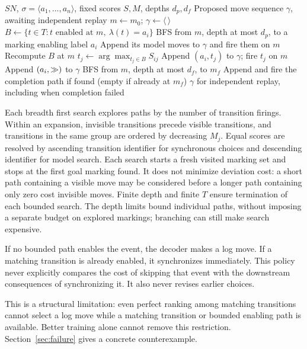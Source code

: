 \begin{algorithm}[!b]
\caption{Construct a candidate with bounded model move searches.}
\label{alg:decode}
\begin{algorithmic}[1]
\Require $SN$, $\sigma=\langle a_1,\ldots,a_n\rangle$, fixed scores $S,M$, depths $d_p,d_f$
\Ensure Proposed move sequence $\gamma$, awaiting independent replay
\State $m\gets m_0$; $\gamma\gets\langle\,\rangle$
  \State $B\gets\{t\in T:t\text{ enabled at }m,\ \lambda(t)=a_i\}$
    \State BFS from $m$, depth at most $d_p$, to a marking enabling label $a_i$
      \State Append its model moves to $\gamma$ and fire them on $m$
      \State Recompute $B$ at $m$
    \EndIf
  \EndIf
    \State $t_j\gets\arg\max_{t_j\in B}S_{ij}$ 
    \State Append $(a_i,t_j)$ to $\gamma$; fire $t_j$ on $m$
  \Else
    \State Append $(a_i,\gg)$ to $\gamma$ 
  \EndIf
\EndFor
\State BFS from $m$, depth at most $d_f$, to $m_f$
\State Append and fire the completion path if found (empty if already at $m_f$)
\State \Return $\gamma$ for independent replay, including when completion failed
\end{algorithmic}
\end{algorithm}

Each breadth first search explores paths by the number of transition firings. Within an expansion, invisible transitions precede visible transitions, and transitions in the same group are ordered by decreasing $M_j$. Equal scores are resolved by ascending transition identifier for synchronous choices and descending identifier for model search. Each search starts a fresh visited marking set and stops at the first goal marking found. It does not minimize deviation cost: a short path containing a visible move may be considered before a longer path containing only zero cost invisible moves. Finite depth and finite $T$ ensure termination of each bounded search. The depth limits bound individual paths, without imposing a separate budget on explored markings; branching can still make search expensive.

If no bounded path enables the event, the decoder makes a log move. If a matching transition is already enabled, it synchronizes immediately. This policy never explicitly compares the cost of skipping that event with the downstream consequences of synchronizing it. It also never revises earlier choices. \begin{revised}This is a structural limitation: even perfect ranking among matching transitions cannot select a log move while a matching transition or bounded enabling path is available. Better training alone cannot remove this restriction. Section~\ref{sec:failure} gives a concrete counterexample.\end{revised}

